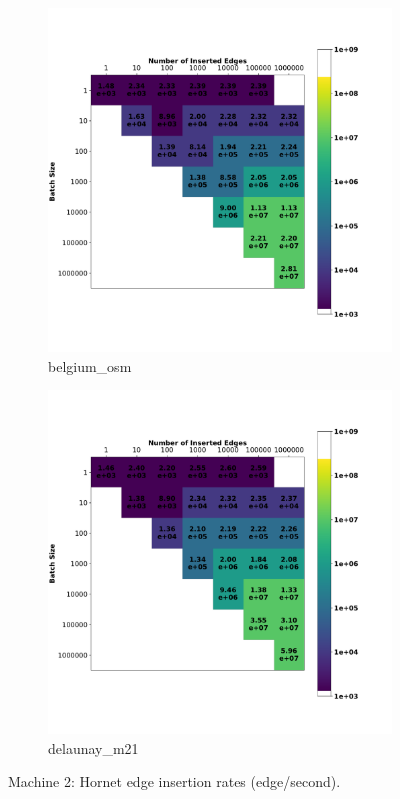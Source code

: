\begin{figure}
    \begin{subfigure}{0.5\textwidth}
        \centering
        \includegraphics[width=\linewidth]{Chapters/Figures/plots/hornet_edge_update_belgium_osm_benchmark.pdf}
        \caption{belgium\_osm}
    \end{subfigure}%
    \begin{subfigure}{0.5\textwidth}
        \centering
        \includegraphics[width=\linewidth]{Chapters/Figures/plots/hornet_edge_update_delaunay_n21_benchmark.pdf}
        \caption{delaunay\_m21}
    \end{subfigure}%
    \caption{Machine 2: Hornet edge insertion rates (edge/second).}
    \label{fig:hornet_insertion_heat_plot}
\end{figure}

